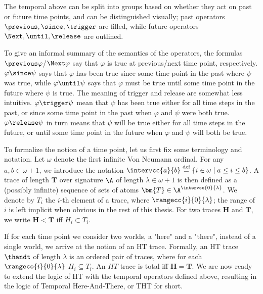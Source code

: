 The temporal above can be split into groups based on whether they act
on past or future time points, and can be distinguished visually; past
operators $\previous, \since, \trigger$ are filled, while future
operators $\Next, \until, \release$ are outlined.

To give an informal summary of the semantics of the operators, the
formulas $\previous \varphi$/$\Next \varphi$ say that $\varphi$ is
true at previous/next time point, respectively.  $\varphi \since \psi$
says that $\varphi$ has been true since some time point in the past
where $\psi$ was true, while $\varphi \until \psi$ says that $\varphi$
must be true until some time point in the future where $\psi$ is true.
The meaning of trigger and release are somewhat less
intuitive. $\varphi \trigger \psi$ mean that $\psi$ has been true
either for all time steps in the past, or since some time point in the
past when $\varphi$ and $\psi$ were both true. $\varphi \release \psi$
in turn means that $\psi$ will be true either for all time steps in
the future, or until some time point in the future when $\varphi$ and
$\psi$ will both be true.

To formalize the notion of a time point, let us first fix some
terminology and notation. Let $\omega$ denote the first infinite Von
Neumann ordinal. For any $a,b \in \omega + 1$, we introduce the
notation
$\intervcc{a}{b} \defeq \{ i \in \omega \mid a \leq i \leq b \}$. A
trace of length $\bm{T}$ over signature $\A$ of length
$\lambda \in \omega + 1$ is then defined as a (possibly infinite)
sequence of sets of atoms $\bm{T} \in \A^{\intervcc{0}{\lambda}}$. We
denote by $T_i$ the $i$-th element of a trace, where
$\rangecc{i}{0}{\lambda}$; the range of $i$ is left implicit when
obvious in the rest of this thesis. For two traces $\bm{H}$ and
$\bm{T}$, we write $\bm{H < T}$ iff $H_i \subset T_i$.

If for each time point we consider two worlds, a "here" and a "there",
instead of a single world, we arrive at the notion of an HT
trace. Formally, an HT trace $\thandt$ of length $\lambda$ is an
ordered pair of traces, where for each $\rangeco{i}{0}{\lambda}$
$H_i \subseteq T_i$. An $HT$ trace is total iff $\bm{H} = \bm{T}$. We
are now ready to extend the logic of HT with the temporal operators
defined above, resulting in the logic of Temporal Here-And-There, or
THT for short.

